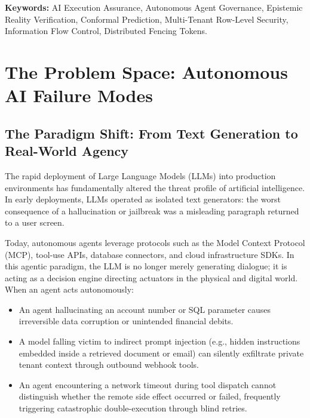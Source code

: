 \documentclass[11pt,a4paper]{article}
\begin{document}
\begin{abstract}
The platform has been empirically verified with \textbf{1,327 passing automated tests} (0 regressions) covering live PostgreSQL Testcontainers, Toxiproxy network chaos injection, and full E2E five-gate transactions. This technical document provides the complete theoretical foundation, high- and low-level architectural designs, mathematical correctness proofs, empirical benchmark evidence, and detailed division of work between the investigators.
\end{abstract}

\vfill
{\small\color{darkslate}\textbf{Keywords:} AI Execution Assurance, Autonomous Agent Governance, Epistemic Reality Verification, Conformal Prediction, Multi-Tenant Row-Level Security, Information Flow Control, Distributed Fencing Tokens.}

\clearpage
\tableofcontents
\clearpage
\listoffigures
\clearpage
\listoftables
\clearpage
{}

\section{The Problem Space: Autonomous AI Failure Modes}

\subsection{The Paradigm Shift: From Text Generation to Real-World Agency}
The rapid deployment of Large Language Models (LLMs) into production environments has fundamentally altered the threat profile of artificial intelligence. In early deployments, LLMs operated as isolated text generators: the worst consequence of a hallucination or jailbreak was a misleading paragraph returned to a user screen. 

Today, autonomous agents leverage protocols such as the Model Context Protocol (MCP), tool-use APIs, database connectors, and cloud infrastructure SDKs. In this agentic paradigm, the LLM is no longer merely generating dialogue; it is acting as a decision engine directing actuators in the physical and digital world. When an agent acts autonomously:
\begin{itemize}[leftmargin=*,itemsep=2pt]
  \item An agent hallucinating an account number or SQL parameter causes irreversible data corruption or unintended financial debits.
  \item A model falling victim to indirect prompt injection (e.g., hidden instructions embedded inside a retrieved document or email) can silently exfiltrate private tenant context through outbound webhook tools.
  \item An agent encountering a network timeout during tool dispatch cannot distinguish whether the remote side effect occurred or failed, frequently triggering catastrophic double-execution through blind retries.
\end{itemize}
\end{document}
